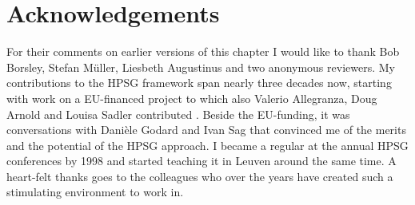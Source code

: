 \documentclass[output=paper
                ,modfonts
                ,nonflat
	        ,collection
	        ,collectionchapter
	        ,collectiontoclongg
 	        ,biblatex
                ,babelshorthands
                ,newtxmath
                ,draftmode
                ,colorlinks, citecolor=brown
]{./langsci/langscibook}
\begin{document}
 
\section*{Acknowledgements}


For their comments on earlier versions of this chapter I would like to thank Bob Borsley, Stefan
Müller, Liesbeth Augustinus and two anonymous reviewers. My contributions to the HPSG framework span
nearly three decades now, starting with work on a EU-financed project to which
also Valerio Allegranza, Doug Arnold and Louisa Sadler contributed \citep{VanEyndeSchmidt98}. 
Beside the EU-funding, it was conversations with Dani\`ele Godard and Ivan Sag that convinced me 
of the merits and the potential of the HPSG approach.  
I became a regular at the annual HPSG conferences by 1998 and started teaching it in Leuven around 
the same time. A heart-felt thanks goes to the colleagues who over the years have created such a stimulating
environment to work in.        

{\sloppy
\printbibliography[heading=subbibliography,notkeyword=this] 
}
\end{document}
